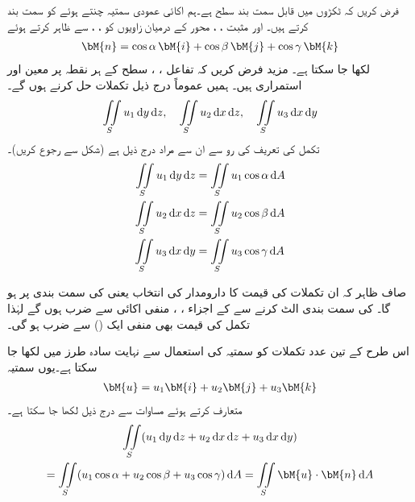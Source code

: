 فرض کریں کہ   ٹکڑوں میں قابل سمت بند سطح ہے۔ہم اکائی عمودی سمتیہ  چنتے ہوئے  کو سمت بند کرتے ہیں۔  اور مثبت ، ،  محور  کے درمیان زاویوں کو ، ،  سے ظاہر کرتے ہوئے
\begin{align}\label{مساوات_خطی_تکمل_اکائی_عمودی_ارکان}
\bM{n}=\cos \alpha \,\bM{i}+\cos \beta \,\bM{j}+\cos \gamma \, \bM{k}
\end{align}
لکھا جا سکتا ہے۔ مزید فرض کریں کہ تفاعل ، ،  سطح   کے ہر نقطہ  پر  معین اور استمراری ہیں۔ ہمیں عموماً درج ذیل تکملات حل کرنے ہوں گے۔
\begin{align*}
\iint\limits_S u_1\dif y\dif z,\quad \iint\limits_S u_2\dif x\dif z,\quad \iint\limits_S u_3\dif x\dif y
\end{align*}
تکمل کی تعریف کی رو سے  ان سے مراد درج ذیل ہے (شکل  سے رجوع کریں)۔
\begin{gather}
\begin{aligned}\label{مساوات_خطی_تکمل_تین_قسم_کے_تکمل_الف}
\iint\limits_S u_1\dif y\dif z&=\iint\limits_S u_1\cos \alpha \dif A\\
\iint\limits_S u_2\dif x\dif z&=\iint\limits_S u_2\cos \beta \dif A\\
\iint\limits_S u_3\dif x\dif y&=\iint\limits_S u_3\cos \gamma \dif A
\end{aligned}
\end{gather}

صاف ظاہر کہ ان تکملات کی قیمت کا دارومدار  کی انتخاب یعنی  کی سمت بندی پر ہو گا۔ کی سمت بندی الٹ کرنے سے  کے اجزاء ، ،  منفی اکائی سے ضرب ہوں گے لہٰذا  تکمل کی قیمت بھی منفی ایک () سے ضرب ہو گی۔

اس طرح کے تین عدد تکملات کو سمتیہ کی استعمال سے نہایت سادہ طرز میں لکھا جا سکتا ہے۔یوں سمتیہ
\begin{align*}
\bM{u}=u_1\bM{i}+u_2\bM{j}+u_3\bM{k}
\end{align*}
متعارف کرتے ہوئے  مساوات  سے درج ذیل لکھا جا سکتا ہے۔
\begin{multline}\label{مساوات_خطی_تکمل_عمودی_سمتیہ_اجزاء_استعمال}
\iint\limits_S (u_1\dif y\dif z+u_2\dif x\dif z+u_3\dif x\dif y)\\
=\iint\limits_S (u_1\cos \alpha +u_2\cos \beta+u_3\cos \gamma)\dif A=\iint\limits_S \bM{u}\cdot \bM{n}\dif A
\end{multline}

